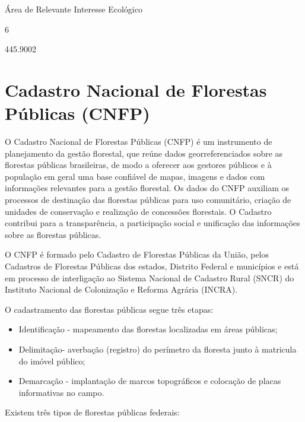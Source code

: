 \documentclass[
  letterpaper,
]{report}
\providecommand{\tightlist}{%
  \setlength{\itemsep}{0pt}\setlength{\parskip}{0pt}}\usepackage{longtable,booktabs,array}
\begin{document}
\n      

Área de Relevante Interesse Ecológico

\n      

6

\n      

445.9002

\n    

\n  

\n

\hypertarget{cadastro-nacional-de-florestas-puxfablicas-cnfp}{%
\section{Cadastro Nacional de Florestas Públicas
(CNFP)}\label{cadastro-nacional-de-florestas-puxfablicas-cnfp}}

O Cadastro Nacional de Florestas Públicas (CNFP) é um instrumento de
planejamento da gestão florestal, que reúne dados georreferenciados
sobre as florestas públicas brasileiras, de modo a oferecer aos gestores
públicos e à população em geral uma base confiável de mapas, imagens e
dados com informações relevantes para a gestão florestal. Os dados do
CNFP auxiliam os processos de destinação das florestas públicas para uso
comunitário, criação de unidades de conservação e realização de
concessões florestais. O Cadastro contribui para a transparência, a
participação social e unificação das informações sobre as florestas
públicas.

O CNFP é formado pelo Cadastro de Florestas Públicas da União, pelos
Cadastros de Florestas Públicas dos estados, Distrito Federal e
municípios e está em processo de interligação ao Sistema Nacional de
Cadastro Rural (SNCR) do Instituto Nacional de Colonização e Reforma
Agrária (INCRA).

O cadastramento das florestas públicas segue três etapas:

\begin{itemize}
\tightlist
\item
  Identificação - mapeamento das florestas localizadas em áreas
  públicas;
\item
  Delimitação- averbação (registro) do perímetro da floresta junto à
  matricula do imóvel público;
\item
  Demarcação - implantação de marcos topográficos e colocação de placas
  informativas no campo.
\end{itemize}

Existem três tipos de florestas públicas federais:
\end{document}
